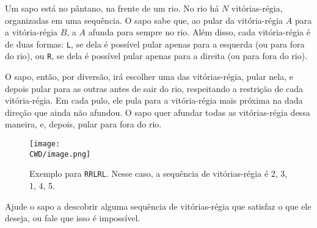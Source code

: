 %

Um sapo está no pântano, na frente de um rio. No rio há $N$ vitórias-régia, organizadas em uma sequência. O sapo sabe que, ao pular da vitória-régia $A$ para a vitória-régia $B$, a $A$ afunda para sempre no rio. Além disso, cada vitória-régia é de duas formas: {\tt L}, se dela é possível pular apenas para a esquerda (ou para fora do rio), ou {\tt R}, se dela é possível pular apenas para a direita (ou para fora do rio).

O sapo, então, por diversão, irá escolher uma das vitórias-régia, pular nela, e depois pular para as outras antes de sair do rio, respeitando a restrição de cada vitória-régia. Em cada pulo, ele pula para a vitória-régia mais próxima na dada direção que ainda não afundou. O sapo quer afundar todas as vitórias-régia dessa maneira, e, depois, pular para fora do rio.

\begin{figure}[H]
  \centering
  \texttt{[image: \\CWD/image.png]}
  \caption{Exemplo para {\tt RRLRL}. Nesse caso, a sequência de vitórias-régia é 2, 3, 1, 4, 5.}
\end{figure}

Ajude o sapo a descobrir alguma sequência de vitórias-régia que satisfaz o que ele deseja, ou fale que isso é impossível.

%
%

%
%



\sampleio
